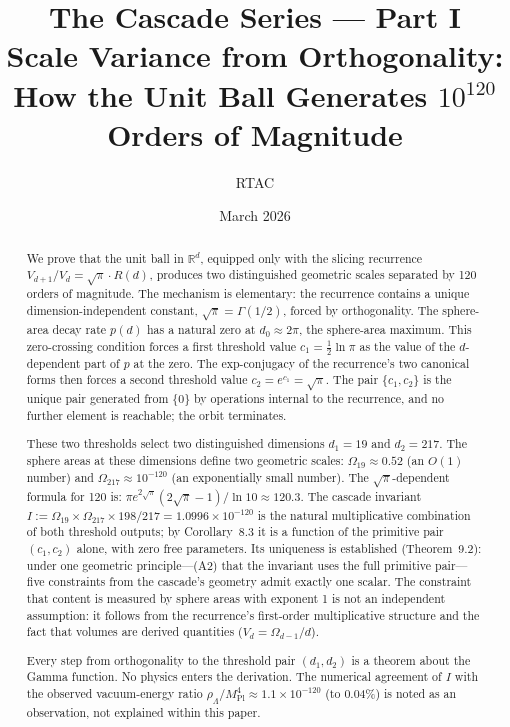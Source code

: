 \documentclass[11pt,a4paper]{article}
\title{The Cascade Series --- Part I\\[0.5em]
\large Scale Variance from Orthogonality:\\
How the Unit Ball Generates $10^{120}$ Orders of Magnitude}
\author{RTAC}
\date{March 2026}
\begin{document}
\maketitle

\begin{abstract}
We prove that the unit ball in $\mathbb{R}^d$, equipped only with the slicing recurrence
$V_{d+1}/V_d = \sqrt{\pi} \cdot R(d)$, produces two distinguished geometric scales separated by
120 orders of magnitude. The mechanism is elementary: the recurrence contains a
unique dimension-independent constant, $\sqrt{\pi} = \Gamma(1/2)$, forced by orthogonality. The
sphere-area decay rate $p(d)$ has a natural zero at $d_0 \approx 2\pi$, the sphere-area maximum.
This zero-crossing condition forces a first threshold value $c_1 = \tfrac{1}{2}\ln\pi$ as the value
of the $d$-dependent part of $p$ at the zero. The exp-conjugacy of the recurrence's
two canonical forms then forces a second threshold value $c_2 = e^{c_1} = \sqrt{\pi}$. The
pair $\{c_1, c_2\}$ is the unique pair generated from $\{0\}$ by operations internal to the
recurrence, and no further element is reachable; the orbit terminates.

These two thresholds select two distinguished dimensions $d_1 = 19$ and $d_2 = 217$.
The sphere areas at these dimensions define two geometric scales: $\Omega_{19} \approx 0.52$
(an $O(1)$ number) and $\Omega_{217} \approx 10^{-120}$ (an exponentially small number). The
$\sqrt{\pi}$-dependent formula for 120 is: $\pi e^{2\sqrt{\pi}}(2\sqrt{\pi}-1)/\ln 10 \approx 120.3$. The cascade invariant
$I := \Omega_{19} \times \Omega_{217} \times 198/217 = 1.0996\times 10^{-120}$ is the natural multiplicative combination
of both threshold outputs; by Corollary~8.3 it is a function of the primitive pair $(c_1, c_2)$
alone, with zero free parameters. Its uniqueness is established (Theorem~9.2): under
one geometric principle---(A2) that the invariant uses the full primitive pair---five
constraints from the cascade's geometry admit exactly one scalar. The constraint
that content is measured by sphere areas with exponent 1 is not an independent
assumption: it follows from the recurrence's first-order multiplicative structure and
the fact that volumes are derived quantities ($V_d = \Omega_{d-1}/d$).

Every step from orthogonality to the threshold pair $(d_1, d_2)$ is a theorem about
the Gamma function. No physics enters the derivation. The numerical agreement of
$I$ with the observed vacuum-energy ratio $\rho_\Lambda/M^4_{\mathrm{Pl}} \approx 1.1\times 10^{-120}$ (to 0.04\%) is noted
as an observation, not explained within this paper.


\end{abstract}
\end{document}
